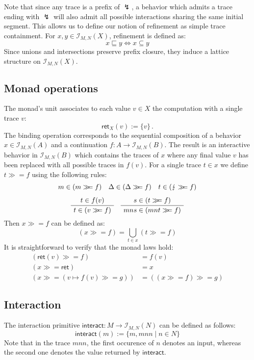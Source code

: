 \documentclass{article}
\newcommand{\kw}[1]{\ensuremath{ \mathsf{#1} }}
\newcommand{\bind}{\gg\!\!=}
\begin{document}
Note that since any trace is a prefix of $\lightning$,
a behavior which admits a trace ending with $\lightning$
will also admit all possible interactions
sharing the same initial segment. 
This allows us to define our notion of refinement
as simple trace containment.
For $x, y \in \mathcal{I}_{M,N}(X)$, refinement is defined as:
\[
    x \sqsubseteq y \Leftrightarrow x \subseteq y
\]
Since unions and intersections
preserve prefix closure,
they induce a lattice structure on $\mathcal{I}_{M,N}(X)$.


\subsection{Monad operations} %

The monad's unit associates to each value $v \in X$
the computation with a single trace $v$:
\[
    \kw{ret}_X(v) := \{ v \} \,.
\]
The binding operation corresponds to
the sequential composition of
a behavior $x \in \mathcal{I}_{M,N}(A)$ and
a continuation $f : A \rightarrow \mathcal{I}_{M,N}(B)$.
The result is an interactive behavior in $\mathcal{I}_{M,N}(B)$ which
contains the traces of $x$ where
any final value $v$ has been replaced with
all possible traces in $f(v)$.
For a single trace $t \in x$ we define $t \bind f$
using the following rules:
\begin{gather*}
  m \in (m \bind f)
  \quad
  \Delta \in (\Delta \bind f)
  \quad
  t \in (\lightning \bind f)
  \\[1ex]
  \AxiomC{$t \in f(v)$}
  \UnaryInfC{$t \in (v \bind f)$}
  \DisplayProof
  \quad
  \AxiomC{$s \in (t \bind f)$}
  \UnaryInfC{$mns \in (mnt \bind f)$}
  \DisplayProof
\end{gather*}
Then $x \bind f$ can be defined as:
\[
    (x \bind f) = \bigcup_{t \in x} (t \bind f)
\]
It is straightforward to verify that
the monad laws hold:
\begin{align*}
  (\kw{ret}(v) \bind f) &= f(v) \\
  (x \bind \kw{ret}) &= x \\
  (x \bind (v \mapsto f(v) \bind g)) &= ((x \bind f) \bind g)
\end{align*}


\subsection{Interaction} %

The interaction primitive
$\kw{interact} : M \rightarrow \mathcal{I}_{M,N}(N)$
can be defined as follows:
\[
    \kw{interact}(m) := \{ m, mnn \mid n \in N \}
\]
Note that in the trace $mnn$,
the first occurence of $n$ denotes an input,
whereas the second one denotes the value returned by $\kw{interact}$.
\end{document}
